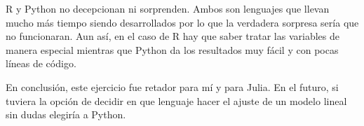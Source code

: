 \textsf{R} y \textsf{Python} no decepcionan ni sorprenden. Ambos son lenguajes que llevan mucho más tiempo siendo desarrollados por lo que la verdadera sorpresa sería que no funcionaran. Aun así, en el caso de \textsf{R} hay que saber tratar las variables de manera especial mientras que \textsf{Python} da los resultados muy fácil y con pocas líneas de código. 

En conclusión, este ejercicio fue retador para mí y para \textsf{Julia}. En el futuro, si tuviera la opción de decidir en que lenguaje hacer el ajuste de un modelo lineal sin dudas elegiría a \textsf{Python}. 







